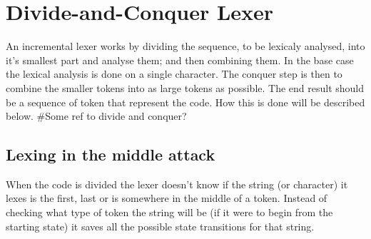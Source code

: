 \chapter{Divide-and-Conquer Lexer}
An incremental lexer works by dividing the sequence, to be lexicaly analysed,
into it's smallest part and analyse them; and then combining them. In the base
case the lexical analysis is done on a single character. The conquer step is
then to combine the smaller tokens into as large tokens as possible. The end
result should be a sequence of token that represent the code. How this is done
will be described below. \#Some ref to divide and conquer?

\section{Lexing in the middle attack} %
When the code is divided the lexer doesn't know if the string (or character) it
lexes is the first, last or is somewhere in the middle of a token. Instead of
checking what type of token the string will be (if it were to begin from the
starting state) it saves all the possible state transitions for that string.

